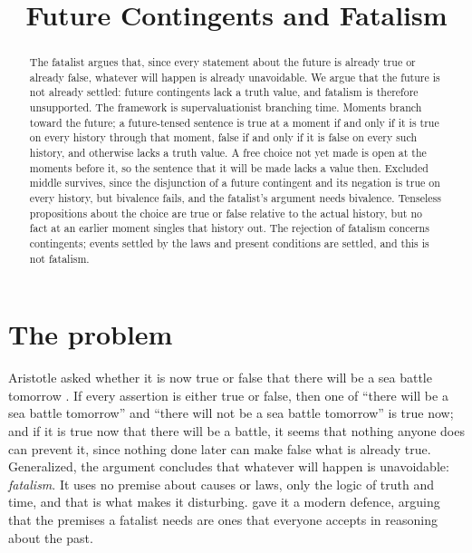 \documentclass{situationist-preprint}
\title{Future Contingents and Fatalism}
\begin{document}
\maketitle

\begin{abstract}
The fatalist argues that, since every statement about the future is already true or already false, whatever will happen is already unavoidable. We argue that the future is not already settled: future contingents lack a truth value, and fatalism is therefore unsupported. The framework is supervaluationist branching time. Moments branch toward the future; a future-tensed sentence is true at a moment if and only if it is true on every history through that moment, false if and only if it is false on every such history, and otherwise lacks a truth value. A free choice not yet made is open at the moments before it, so the sentence that it will be made lacks a value then. Excluded middle survives, since the disjunction of a future contingent and its negation is true on every history, but bivalence fails, and the fatalist's argument needs bivalence. Tenseless propositions about the choice are true or false relative to the actual history, but no fact at an earlier moment singles that history out. The rejection of fatalism concerns contingents; events settled by the laws and present conditions are settled, and this is not fatalism.
\end{abstract}

\section{The problem}

Aristotle asked whether it is now true or false that there will be a sea battle tomorrow \citep[ch.~9]{AristotleDeInt}. If every assertion is either true or false, then one of \enquote{there will be a sea battle tomorrow} and \enquote{there will not be a sea battle tomorrow} is true now; and if it is true now that there will be a battle, it seems that nothing anyone does can prevent it, since nothing done later can make false what is already true. Generalized, the argument concludes that whatever will happen is unavoidable: \emph{fatalism}. It uses no premise about causes or laws, only the logic of truth and time, and that is what makes it disturbing. \citet{Taylor1962} gave it a modern defence, arguing that the premises a fatalist needs are ones that everyone accepts in reasoning about the past.
\end{document}
